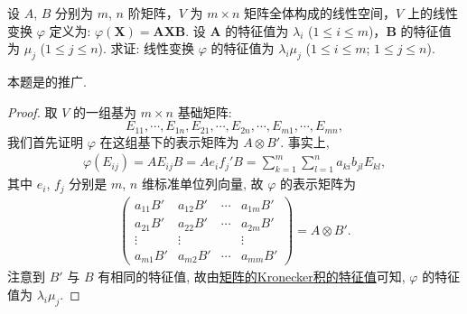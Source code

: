 \documentclass[../../main.tex]{subfiles}
\begin{document}
\begin{proposition}\label{proposition:线性变换AXB的特征值}
设 $A$, $B$ 分别为 $m$, $n$ 阶矩阵，$V$ 为 $m\times n$ 矩阵全体构成的线性空间，$V$ 上的线性变换 $\varphi$ 定义为: $\varphi(\boldsymbol{X}) = \boldsymbol{A}\boldsymbol{X}\boldsymbol{B}$. 设 $\boldsymbol{A}$ 的特征值为 $\lambda_i$ ($1\leq i\leq m$)，$\boldsymbol{B}$ 的特征值为 $\mu_j$ ($1\leq j\leq n$). 求证: 线性变换 $\varphi$ 的特征值为 $\lambda_i\mu_j$ ($1\leq i\leq m$; $1\leq j\leq n$). 
\end{proposition}
\begin{remark}
本题是的推广.
\end{remark}
\begin{proof}
取 $V$ 的一组基为 $m\times n$ 基础矩阵:
\[
E_{11},\cdots,E_{1n},E_{21},\cdots,E_{2n},\cdots,E_{m1},\cdots,E_{mn},
\]
我们首先证明 $\varphi$ 在这组基下的表示矩阵为 $A\otimes B'$. 事实上,
\begin{align*}
\varphi(E_{ij}) = AE_{ij}B = Ae_{i}f_{j}'B = \sum_{k = 1}^{m}\sum_{l = 1}^{n}a_{ki}b_{jl}E_{kl},
\end{align*}
其中 $e_{i}$, $f_{j}$ 分别是 $m$, $n$ 维标准单位列向量, 故 $\varphi$ 的表示矩阵为
\begin{align*}
\begin{pmatrix}
a_{11}B' & a_{12}B' & \cdots & a_{1m}B' \\
a_{21}B' & a_{22}B' & \cdots & a_{2m}B' \\
\vdots & \vdots & & \vdots \\
a_{m1}B' & a_{m2}B' & \cdots & a_{mm}B'
\end{pmatrix}=A\otimes B'.
\end{align*}
注意到 $B'$ 与 $B$ 有相同的特征值, 故由\hyperref[proposition:矩阵的Kronecker积的特征值]{矩阵的Kronecker积的特征值}可知, $\varphi$ 的特征值为 $\lambda_{i}\mu_{j}$.
\end{proof}
\end{document}
